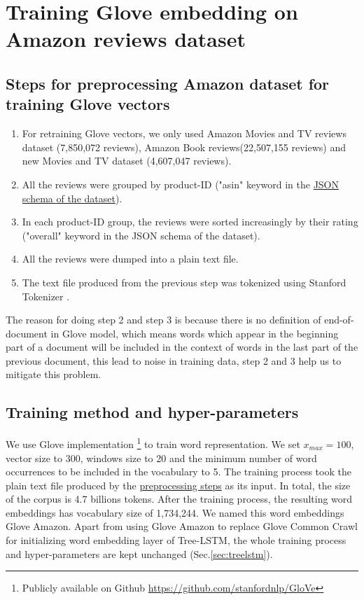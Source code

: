 \hypertarget{sec:Glove-Amazon}{\section{Training Glove embedding on Amazon reviews dataset}}
\label{sec:gloveamazone}
\subsection{Steps for preprocessing Amazon dataset for training Glove vectors}
\label{sec:preprocessamazonglove}
\begin{enumerate}
\item For retraining Glove vectors, we only used Amazon Movies and TV reviews dataset (7,850,072 reviews)\cite{mcauley2013hidden}, Amazon Book reviews(22,507,155 reviews) and new Movies and TV dataset (4,607,047 reviews)\cite{McAuleyTSH15}\cite{HeM16}.
\item All the reviews were grouped by product-ID ("asin" keyword in the \hyperref[sec:amazon]{JSON schema of the dataset}). 
\item In each product-ID group, the reviews were sorted increasingly by their rating ("overall" keyword in the JSON schema of the dataset).
\item All the reviews were dumped into a plain text file.
\item The text file produced from the previous step was tokenized using Stanford Tokenizer \cite{tokenizerpart}. 
\end{enumerate}
The reason for doing step 2 and step 3 is because there is no definition of end-of-document in Glove model, which means words which appear in the beginning part of a document will be included in the context of words in the last part of the previous document, this lead to noise in training data, step 2 and 3 help us to mitigate this problem. 

\subsection{Training method and hyper-parameters}
We use Glove implementation \footnote{Publicly available on Github \url{https://github.com/stanfordnlp/GloVe}} to train word representation. 
We set $x_{max} = 100$, vector size to 300, windows size to 20 and the minimum number of word occurrences to be included in the vocabulary to  5.
The training process took the plain text file produced by the \hyperref[sec:preprocessamazonglove]{preprocessing steps} as its input. 
In total, the size of the corpus is 4.7 billions tokens. 
After the training process, the resulting word embeddings has vocabulary size of 1,734,244.
We named this word embeddings Glove Amazon. 
Apart from using Glove Amazon to replace Glove Common Crawl for initializing word embedding layer of Tree-LSTM, the whole training process and hyper-parameters are kept unchanged (Sec.\ref{sec:treelstm}).

